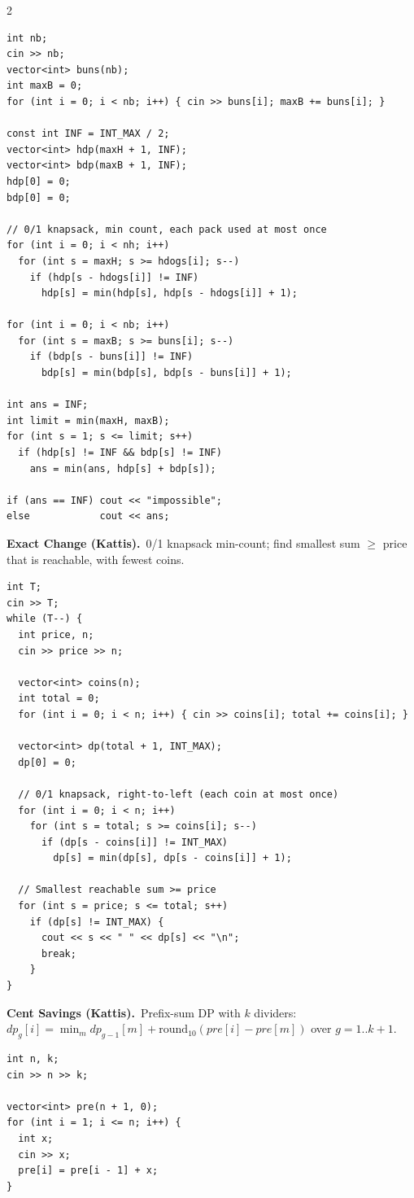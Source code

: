 \documentclass[10pt,letterpaper]{extarticle}
\newcommand{\prob}[2]{\par\addvspace{10pt}\noindent\label{prob:#1}\textbf{\normalsize #1.}\ {\small #2}\par\nopagebreak}
\begin{document}
\begin{multicols*}{2}
\begin{lstlisting}[style=cppt]
int nb;
cin >> nb;
vector<int> buns(nb);
int maxB = 0;
for (int i = 0; i < nb; i++) { cin >> buns[i]; maxB += buns[i]; }

const int INF = INT_MAX / 2;
vector<int> hdp(maxH + 1, INF);
vector<int> bdp(maxB + 1, INF);
hdp[0] = 0;
bdp[0] = 0;

// 0/1 knapsack, min count, each pack used at most once
for (int i = 0; i < nh; i++)
  for (int s = maxH; s >= hdogs[i]; s--)
    if (hdp[s - hdogs[i]] != INF)
      hdp[s] = min(hdp[s], hdp[s - hdogs[i]] + 1);

for (int i = 0; i < nb; i++)
  for (int s = maxB; s >= buns[i]; s--)
    if (bdp[s - buns[i]] != INF)
      bdp[s] = min(bdp[s], bdp[s - buns[i]] + 1);

int ans = INF;
int limit = min(maxH, maxB);
for (int s = 1; s <= limit; s++)
  if (hdp[s] != INF && bdp[s] != INF)
    ans = min(ans, hdp[s] + bdp[s]);

if (ans == INF) cout << "impossible";
else            cout << ans;
\end{lstlisting}

\prob{Exact Change (Kattis)}{0/1 knapsack min-count; find smallest sum $\ge$ price that is reachable, with fewest coins.}
\begin{lstlisting}[style=cppt]
int T;
cin >> T;
while (T--) {
  int price, n;
  cin >> price >> n;

  vector<int> coins(n);
  int total = 0;
  for (int i = 0; i < n; i++) { cin >> coins[i]; total += coins[i]; }

  vector<int> dp(total + 1, INT_MAX);
  dp[0] = 0;

  // 0/1 knapsack, right-to-left (each coin at most once)
  for (int i = 0; i < n; i++)
    for (int s = total; s >= coins[i]; s--)
      if (dp[s - coins[i]] != INT_MAX)
        dp[s] = min(dp[s], dp[s - coins[i]] + 1);

  // Smallest reachable sum >= price
  for (int s = price; s <= total; s++)
    if (dp[s] != INT_MAX) {
      cout << s << " " << dp[s] << "\n";
      break;
    }
}
\end{lstlisting}

\prob{Cent Savings (Kattis)}{Prefix-sum DP with $k$ dividers: $dp_g[i]=\min_m dp_{g-1}[m]+\text{round}_{10}(pre[i]-pre[m])$ over $g=1..k{+}1$.}
\begin{lstlisting}[style=cppt]
int n, k;
cin >> n >> k;

vector<int> pre(n + 1, 0);
for (int i = 1; i <= n; i++) {
  int x;
  cin >> x;
  pre[i] = pre[i - 1] + x;
}


\end{lstlisting}
\end{multicols*}
\end{document}
